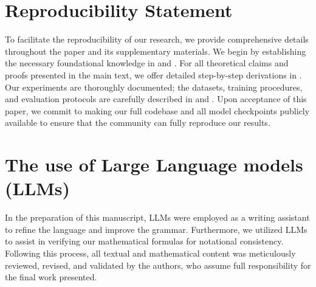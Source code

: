 \documentclass{article} %
\begin{document}
\section{Reproducibility Statement}
To facilitate the reproducibility of our research, we provide comprehensive details throughout the paper and its supplementary materials. We begin by establishing the necessary foundational knowledge in  and . For all theoretical claims and proofs presented in the main text, we offer detailed step-by-step derivations in . Our experiments are thoroughly documented; the datasets, training procedures, and evaluation protocols are carefully described in  and . Upon acceptance of this paper, we commit to making our full codebase and all model checkpoints publicly available to ensure that the community can fully reproduce our results.

\section{The use of Large Language models (LLMs)}
In the preparation of this manuscript, LLMs were employed as a writing assistant to refine the language and improve the grammar. Furthermore, we utilized LLMs to assist in verifying our mathematical formulas for notational consistency. Following this process, all textual and mathematical content was meticulously reviewed, revised, and validated by the authors, who assume full responsibility for the final work presented.



\newpage

\end{document}
